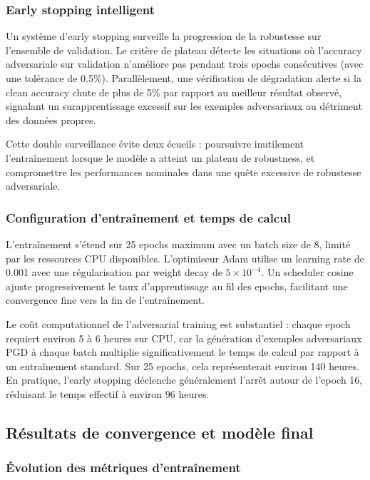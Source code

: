 \subsubsection{Early stopping intelligent}

Un système d'early stopping surveille la progression de la robustesse sur l'ensemble de validation. Le critère de plateau détecte les situations où l'accuracy adversariale sur validation n'améliore pas pendant trois epochs consécutives (avec une tolérance de 0.5\%). Parallèlement, une vérification de dégradation alerte si la clean accuracy chute de plus de 5\% par rapport au meilleur résultat observé, signalant un surapprentissage excessif sur les exemples adversariaux au détriment des données propres.

Cette double surveillance évite deux écueils : poursuivre inutilement l'entraînement lorsque le modèle a atteint un plateau de robustness, et compromettre les performances nominales dans une quête excessive de robustesse adversariale.

\subsubsection{Configuration d'entraînement et temps de calcul}

L'entraînement s'étend sur 25 epochs maximum avec un batch size de 8, limité par les ressources CPU disponibles. L'optimiseur Adam utilise un learning rate de 0.001 avec une régularisation par weight decay de $5 \times 10^{-4}$. Un scheduler cosine ajuste progressivement le taux d'apprentissage au fil des epochs, facilitant une convergence fine vers la fin de l'entraînement.

Le coût computationnel de l'adversarial training est substantiel : chaque epoch requiert environ 5 à 6 heures sur CPU, car la génération d'exemples adversariaux PGD à chaque batch multiplie significativement le temps de calcul par rapport à un entraînement standard. Sur 25 epochs, cela représenterait environ 140 heures. En pratique, l'early stopping déclenche généralement l'arrêt autour de l'epoch 16, réduisant le temps effectif à environ 96 heures.

\subsection{Résultats de convergence et modèle final}

\subsubsection{Évolution des métriques d'entraînement}

